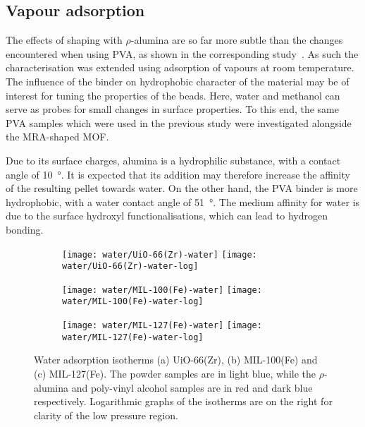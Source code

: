 
\subsection{Vapour adsorption}

The effects of shaping with \(\rho\)-alumina are 
so far more subtle than the changes encountered when using 
PVA, as shown in the corresponding 
study~\cite{chanutObservingEffectsShaping2016}.
As such the characterisation was extended using adsorption
of vapours at room temperature.
The influence of the binder on hydrophobic character of the
material may be of interest for tuning the properties of the 
beads. Here, water and methanol
can serve as probes for small changes in surface properties.
To this end, the same PVA samples which were 
used in the previous study were investigated alongside 
the MRA-shaped MOF.

Due to its surface charges, alumina is a 
hydrophilic substance, with a contact 
angle of \SI{10}{\degree}. It is expected that its 
addition may therefore increase the affinity 
of the resulting pellet towards water. On the other hand,
the PVA binder is more hydrophobic, with a water contact
angle of \SI{51}{\degree}. The medium affinity for water
is due to the surface hydroxyl functionalisations, which
can lead to hydrogen bonding.

\begin{figure}[p!]
    \centering
    
    \begin{subfigure}{\linewidth}
        \centering
        \texttt{[image: water/UiO-66(Zr)-water]}%
        \texttt{[image: water/UiO-66(Zr)-water-log]}%
        \caption{}\label{shaping:fig:wateruio66}
    \end{subfigure}%

    \begin{subfigure}{\linewidth}
        \centering
        \texttt{[image: water/MIL-100(Fe)-water]}%
        \texttt{[image: water/MIL-100(Fe)-water-log]}%
        \caption{}\label{shaping:fig:watermil100}
    \end{subfigure}%

    \begin{subfigure}{\linewidth}
        \centering
        \texttt{[image: water/MIL-127(Fe)-water]}%
        \texttt{[image: water/MIL-127(Fe)-water-log]}%
        \caption{}\label{shaping:fig:watermil127}%
    \end{subfigure}%
    
    \caption{Water adsorption isotherms (a) UiO-66(Zr), 
    (b) MIL-100(Fe) and (c) MIL-127(Fe). The powder samples are in light
    blue, while the \(\rho\)-alumina and poly-vinyl alcohol samples are
    in red and dark blue respectively. Logarithmic graphs of the
    isotherms are on the right for clarity of the low
    pressure region.}%
    \label{shaping:fig:wateradsorption}
\end{figure}

